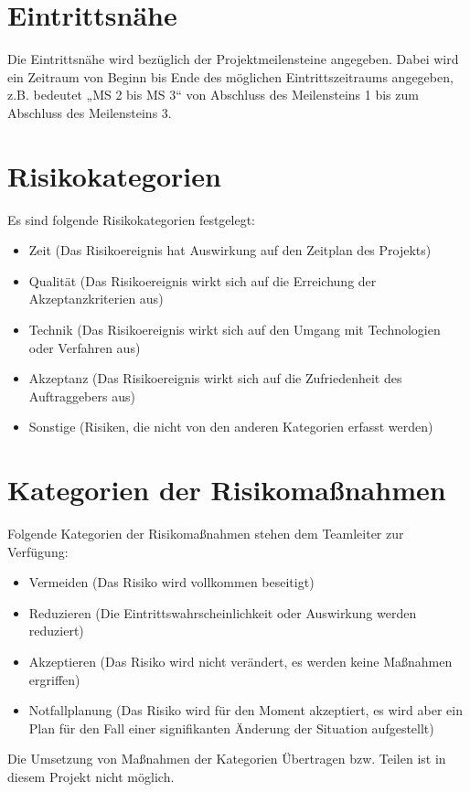\documentclass[a4paper,11pt,listof=numbered,glossary=totoc,parskip=half,toc=bib]{scrreprt}
\begin{document}
\section{Eintrittsnähe}
\label{subsec:eintrittsnaehe}

Die Eintrittsnähe wird bezüglich der Projektmeilensteine angegeben. Dabei wird ein Zeitraum von Beginn bis Ende des möglichen Eintrittszeitraums angegeben, z.B. bedeutet „MS 2 bis MS 3“ von Abschluss des Meilensteins 1 bis zum Abschluss des Meilensteins 3.

\section{Risikokategorien}
\label{subsec:risikokategorien}

Es sind folgende Risikokategorien festgelegt:
\begin{itemize}
	\item Zeit (Das Risikoereignis hat Auswirkung auf den Zeitplan des Projekts)
	\item Qualität (Das Risikoereignis wirkt sich auf die Erreichung der Akzeptanzkriterien aus)
	\item Technik (Das Risikoereignis wirkt sich auf den Umgang mit Technologien oder Verfahren aus)
	\item Akzeptanz (Das Risikoereignis wirkt sich auf die Zufriedenheit des Auftraggebers aus)
	\item Sonstige (Risiken, die nicht von den anderen Kategorien erfasst werden)
\end{itemize}

\section{Kategorien der Risikomaßnahmen}

Folgende Kategorien der Risikomaßnahmen stehen dem Teamleiter zur Verfügung:
\begin{itemize}
	\item Vermeiden (Das Risiko wird vollkommen beseitigt)
	\item Reduzieren (Die Eintrittswahrscheinlichkeit oder Auswirkung werden reduziert)
	\item Akzeptieren (Das Risiko wird nicht verändert, es werden keine Maßnahmen ergriffen)
	\item Notfallplanung (Das Risiko wird für den Moment akzeptiert, es wird aber ein Plan für den Fall einer signifikanten Änderung der Situation aufgestellt)
\end{itemize}

Die Umsetzung von Maßnahmen der Kategorien Übertragen bzw. Teilen ist in diesem Projekt nicht möglich.

	\newpage	
	\printbibliography[heading=bibnumbered,title=Literaturverzeichnis]
\end{document}
